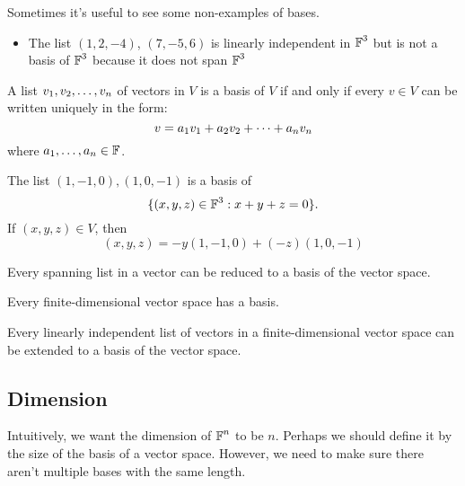 Sometimes it's useful to see some non-examples of bases.

\begin{example} 
    \begin{itemize}
        \item The list $(1, 2, -4)$, $(7, -5, 6)$ is linearly independent
        in $\operatorname{\mathbb{F}}^3$ but is not a basis of $\operatorname{\mathbb{F}}^3$ because it does not span $\operatorname{\mathbb{F}}^3$
    \end{itemize}
\end{example}

\begin{theorem} 
    A list $v_1, v_2, \ldots, v_n$ of vectors in $V$ is a basis of $V$ if and only if every
    $v \in V$ can be written uniquely in the form:
    \[ v = a_1v_1 + a_2v_2 + \cdots + a_nv_n \]
    where $a_1, \dots, a_n \in \operatorname{\mathbb{F}}$.
\end{theorem}

\begin{example}
    The list $(1, -1, 0), (1, 0, -1)$ is a basis of 
       \[ \{(x, y, z) \in \operatorname{\mathbb{F}}^3 : x + y + z = 0\}. \]
    If $(x, y, z) \in V$, then
    \[ (x, y, z) = -y(1, -1, 0) + (-z)(1, 0, -1) \]
\end{example}

\begin{theorem} 
    Every spanning list in a vector can be reduced to a basis of the vector space.
\end{theorem}

\begin{theorem} 
    Every finite-dimensional vector space has a basis.
\end{theorem}

\begin{theorem} 
    Every linearly independent list of vectors in a finite-dimensional
    vector space can be extended to a basis of the vector space.
\end{theorem}

\subsection{Dimension}

Intuitively, we want the dimension of $\operatorname{\mathbb{F}}^n$ to be $n$. Perhaps
we should define it by the size of the basis of a vector space.
However, we need to make sure there aren't multiple bases with the
same length.

